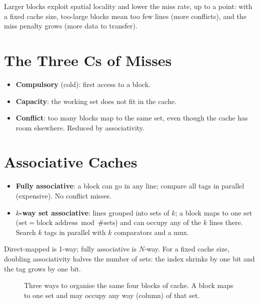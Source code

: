 Larger blocks exploit spatial locality and lower the miss rate, up to a
point: with a fixed cache size, too-large blocks mean too few lines (more
conflicts), and the miss penalty grows (more data to transfer).

\section{The Three Cs of Misses}

\begin{itemize}
  \item \textbf{Compulsory} (cold): first access to a block.
  \item \textbf{Capacity}: the working set does not fit in the cache.
  \item \textbf{Conflict}: too many blocks map to the same set, even though
    the cache has room elsewhere. Reduced by associativity.
\end{itemize}

\section{Associative Caches}

\begin{itemize}
  \item \textbf{Fully associative}: a block can go in any line; compare all
    tags in parallel (expensive). No conflict misses.
  \item \textbf{$k$-way set associative}: lines grouped into sets of $k$; a
    block maps to one set ($\text{set} = \text{block address} \bmod
    \#\text{sets}$) and can occupy any of the $k$ lines there. Search $k$
    tags in parallel with $k$ comparators and a mux.
\end{itemize}
Direct-mapped is 1-way; fully associative is $N$-way. For a fixed cache
size, doubling associativity halves the number of sets: the index shrinks by
one bit and the tag grows by one bit.

\begin{figure}[H]
\centering
{}
\caption{Three ways to organise the same four blocks of cache. A block
maps to one set and may occupy any way (column) of that set.}
\end{figure}

